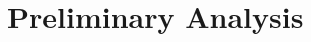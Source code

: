 \documentclass[15pt,letterpaper]{article}
\begin{document}



\section{Preliminary Analysis}\label{prelim}
\end{document}
